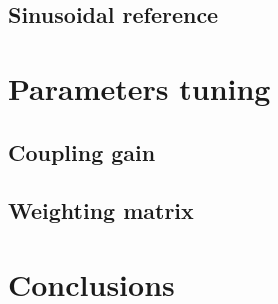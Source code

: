 \documentclass{article}
\begin{document}
\subsection{Sinusoidal reference}


\section{Parameters tuning}
\subsection{Coupling gain}
\subsection{Weighting matrix}

\section{Conclusions}
\end{document}
